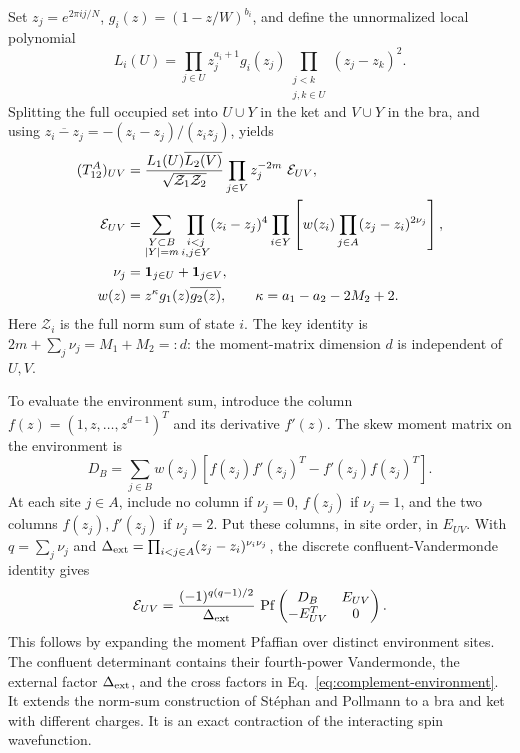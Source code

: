 Set $z_j=e^{2\pi i j/N}$, $g_i(z)=(1-z/W)^{b_i}$,
and define the unnormalized local polynomial
\begin{equation}
 L_i(U)=\prod_{j\in U}z_j^{a_i+1}g_i(z_j)
        \prod_{\substack{j<k\\j,k\in U}}(z_j-z_k)^2 .
 \label{eq:complement-local-boson}
\end{equation}
Splitting the full occupied set into $U\cup Y$ in the ket and
$V\cup Y$ in the bra, and using
$\overline{z_i-z_j}=-(z_i-z_j)/(z_i z_j)$, yields
\begin{align}
 (T_{12}^A)_{UV}
 &=\frac{L_1(U)\overline{L_2(V)}}{\sqrt{{\cal Z}_1{\cal Z}_2}}
       \prod_{j\in V}z_j^{-2m}\ {\cal E}_{UV},\nonumber\\
 {\cal E}_{UV}
 &=\sum_{\substack{Y\subset B\\|Y|=m}}
   \prod_{\substack{i<j\\i,j\in Y}}(z_i-z_j)^4
   \prod_{i\in Y}\left[
       w(z_i)\prod_{j\in A}(z_j-z_i)^{2\nu_j}\right],\nonumber\\
 \nu_j&=\mathbf1_{j\in U}+\mathbf1_{j\in V},\nonumber\\
 w(z)&=z^\kappa g_1(z)\overline{g_2(z)},\qquad
 \kappa=a_1-a_2-2M_2+2 .
 \label{eq:complement-environment}
\end{align}
Here $\mathcal Z_i$ is the full norm sum of state $i$.
The key identity is $2m+\sum_j\nu_j=M_1+M_2=:d$:
the moment-matrix dimension $d$ is independent of $U,V$.

To evaluate the environment sum, introduce the column
$f(z)=(1,z,\ldots,z^{d-1})^T$ and its derivative $f'(z)$.
The skew moment matrix on the environment is
\begin{equation}
 D_B=\sum_{j\in B}w(z_j)
       [f(z_j)f'(z_j)^T-f'(z_j)f(z_j)^T].
 \label{eq:complement-cross-moment}
\end{equation}
At each site $j\in A$, include no column if $\nu_j=0$,
$f(z_j)$ if $\nu_j=1$, and the two columns $f(z_j),f'(z_j)$
if $\nu_j=2$. Put these columns, in site order, in $E_{UV}$.
With $q=\sum_j\nu_j$ and
$\Delta_{\rm ext}=\prod_{i<j\in A}(z_j-z_i)^{\nu_i\nu_j}$,
the discrete confluent-Vandermonde identity gives
\begin{equation}
 {\cal E}_{UV}=
 \frac{(-1)^{q(q-1)/2}}{\Delta_{\rm ext}}\,
 \operatorname{Pf}
 \begin{pmatrix}D_B&E_{UV}\\-E_{UV}^T&0\end{pmatrix}.
 \label{eq:complement-bordered-pf}
\end{equation}
This follows by expanding the moment Pfaffian over distinct environment
sites. The confluent determinant contains their fourth-power Vandermonde,
the external factor $\Delta_{\rm ext}$, and the cross factors in
Eq.~\eqref{eq:complement-environment}. It extends the norm-sum construction
of St\'ephan and Pollmann \cite{Stephan} to a bra and ket with different
charges. It is an exact contraction of the interacting spin wavefunction.

